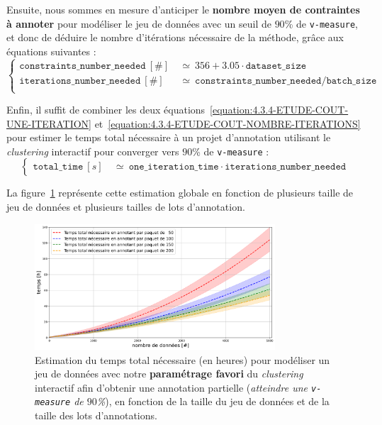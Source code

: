 			Ensuite, nous sommes en mesure d'anticiper le \textbf{nombre moyen de contraintes à annoter} pour modéliser le jeu de données avec un seuil de $90$\% de \texttt{v-measure}, et donc de déduire le nombre d'itérations nécessaire de la méthode, grâce aux équations suivantes :
			\begin{equation}
				\label{equation:4.3.4-ETUDE-COUT-NOMBRE-ITERATIONS}
				\begin{cases}
					\texttt{constraints\_number\_needed}~[\#] &
						~\simeq~356 + 3.05 \cdot \texttt{dataset\_size} \\
					\texttt{iterations\_number\_needed}~[\#] &
						~\simeq~\texttt{constraints\_number\_needed} / \texttt{batch\_size} \\
				\end{cases}
			\end{equation}
			
			Enfin, il suffit de combiner les deux équations~\ref{equation:4.3.4-ETUDE-COUT-UNE-ITERATION} et~\ref{equation:4.3.4-ETUDE-COUT-NOMBRE-ITERATIONS} pour estimer le temps total nécessaire à un projet d'annotation utilisant le \textit{clustering} interactif pour converger vers $90$\% de \texttt{v-measure} :
			\begin{equation}
				\label{equation:4.3.4-ETUDE-COUT-TOTAL}
				\begin{cases}
					\texttt{total\_time}~[s] &
						~\simeq~\texttt{one\_iteration\_time} \cdot \texttt{iterations\_number\_needed}
				\end{cases}
			\end{equation}
			
			La figure~\ref{figure:4.3.4-ETUDE-COUT-TOTAL} représente cette estimation globale en fonction de plusieurs taille de jeu de données et plusieurs tailles de lots d'annotation.
			\begin{figure}[!htb]
				\centering
				\includegraphics[width=0.8\textwidth]{figures/etude-temps-total-1-modelisation}
				\caption{Estimation du temps total nécessaire (en heures) pour modéliser un jeu de données avec notre \textbf{paramétrage favori} du \textit{clustering} interactif afin d'obtenir une annotation partielle (\textit{atteindre une \texttt{v-measure} de $90$\%}), en fonction de la taille du jeu de données et de la taille des lots d'annotations.}
				\label{figure:4.3.4-ETUDE-COUT-TOTAL}
			\end{figure}

